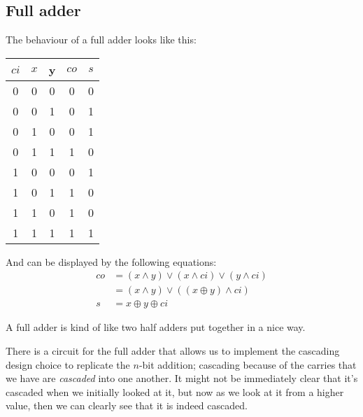 \documentclass[11pt,a4paper,titlepage,dvipsnames,cmyk]{scrartcl}
\begin{document}
\subsection{Full adder}%
\label{sub:full}
The behaviour of a full adder looks like this:
\begin{center}
    \begin{tabular}{|c c c|c|c|}
        \hline
        $ci$ & $x$ & y & $co$ & $s$ \\ \hline
        0 & 0 & 0 & 0 & 0 \\ \hline
        0 & 0 & 1 & 0 & 1 \\ \hline
        0 & 1 & 0 & 0 & 1 \\ \hline
        0 & 1 & 1 & 1 & 0 \\ \hline
        1 & 0 & 0 & 0 & 1 \\ \hline
        1 & 0 & 1 & 1 & 0 \\ \hline
        1 & 1 & 0 & 1 & 0 \\ \hline
        1 & 1 & 1 & 1 & 1 \\ \hline
    \end{tabular}
\end{center}

And can be displayed by the following equations:
\begin{align*}
    co &= (x \wedge y) \vee (x \wedge ci) \vee (y \wedge ci) \\
       &= (x \wedge y) \vee ((x \oplus y) \wedge ci) \\
    s &= x \oplus y \oplus ci
\end{align*}

A full adder is kind of like two half adders put together in a nice way.

There is a circuit for the full adder that allows us to implement the
cascading design choice to replicate the $n$-bit addition; cascading
because of the carries that we have are \textit{cascaded} into one
another. It might not be immediately clear that it's cascaded when we
initially looked at it, but now as we look at it from a higher value, then
we can clearly see that it is indeed cascaded.
\end{document}
